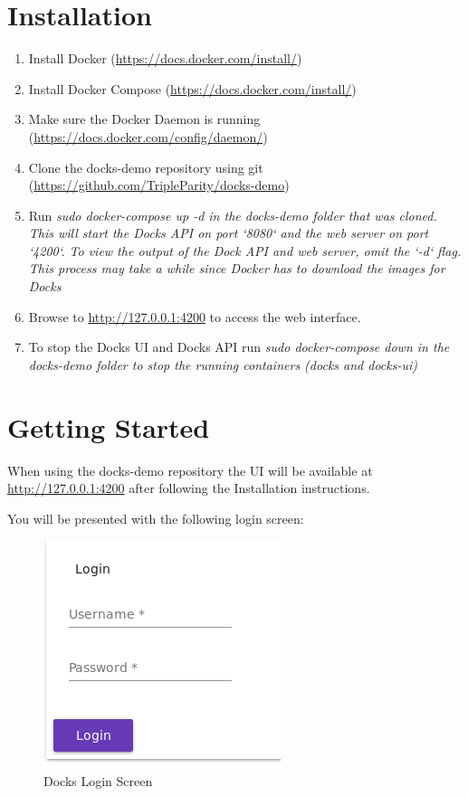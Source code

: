 \documentclass[]{article}
\begin{document}
\pagebreak

\section{Installation}
\begin{enumerate}
	\item Install Docker (\url{https://docs.docker.com/install/})
	\item Install Docker Compose (\url{https://docs.docker.com/install/})
	\item Make sure the Docker Daemon is running (\url{https://docs.docker.com/config/daemon/})
	\item Clone the docks-demo repository using git (\url{https://github.com/TripleParity/docks-demo})
	\item Run \em{sudo docker-compose up -d} in the \em{docks-demo} folder that was cloned. This will start the Docks API on port `8080` and the web server on port `4200`. To view the output of the Dock API and web server, omit the `-d` flag. This process may take a while since Docker has to download the images for Docks
	\item Browse to \url{http://127.0.0.1:4200} to access the web interface.
	\item To stop the Docks UI and Docks API run \em{sudo docker-compose down} in the \em{docks-demo} folder to stop the running containers (docks and docks-ui)
\end{enumerate}


\section{Getting Started}
When using the docks-demo repository the UI will be available at \url{http://127.0.0.1:4200} after following the Installation instructions.

You will be presented with the following login screen:

\begin{figure}[h!]
	\centering
	\includegraphics[scale=0.5]{manual_login.png}
	\caption{Docks Login Screen}
\end{figure}
\end{document}
